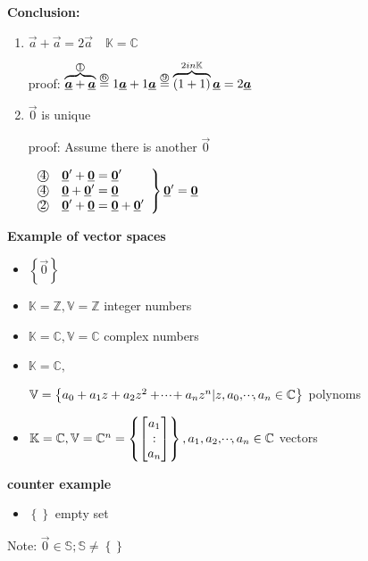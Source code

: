 \textbf{Conclusion:}
\begin{enumerate}
\item $\vec{a}+\vec{a}=2\vec{a} \quad \mathbb{K}=\mathbb{C}$

proof:	$\overbrace{\underline{\boldsymbol {a}}+\underline{\boldsymbol {a}}}^{\textrm{\textcircled{1}}}  \overset{\textrm{\textcircled{6}}}{=} 1\underline{\boldsymbol {a}}+1\underline{\boldsymbol {a}} \overset{\textrm{\textcircled{9}}}{=} \overbrace{(1+1)}^{2 in\mathbb{K}}\underline{\boldsymbol {a}}=2\underline{\boldsymbol {a}}$
\item $\vec{0}$ is unique 


proof: Assume there is another $\vec{0}$

$\left. \begin{array}{l}
\textrm{\textcircled{4}}\quad \underline{\boldsymbol {0}}'+\underline{\boldsymbol {0}}= \underline{\boldsymbol {0}}'\\
\textrm{\textcircled{4}}\quad \underline{\boldsymbol {0}}+\underline{\boldsymbol {0}}'= \underline{\boldsymbol {0}}\\
\textrm{\textcircled{2}}\quad \underline{\boldsymbol {0}}'+\underline{\boldsymbol {0}}=\underline{\boldsymbol {0}}+\underline{\boldsymbol {0}}'
\end{array} \right\rbrace
\underline{\boldsymbol {0}}'=\underline{\boldsymbol {0}}$
\end{enumerate}

\textbf{Example of vector spaces}

\begin{itemize}
\item $\left\lbrace\vec{0}\right\rbrace$ 
\item $\mathbb{K}=\mathbb{Z}, \mathbb{V}=\mathbb{Z}$ \quad integer numbers
\item $\mathbb{K}=\mathbb{C}, \mathbb{V}=\mathbb{C}$ \quad complex numbers
\item $\mathbb{K}=\mathbb{C},$

$\mathbb{V}=\left\lbrace a_0+a_1z+a_2z^2+ \shdots +a_nz^n |z,a_0,\shdots,a_n \in \mathbb{C} \right\rbrace$ \quad polynoms
\item $\mathbb{K}=\mathbb{C}, \mathbb{V}=\mathbb{C}^n=\left\lbrace \begin{bmatrix}
a_1 \\ : \\ a_n
\end{bmatrix} \right\rbrace, a_1,a_2,\!\cdot \!\cdot\!\cdot\!,a_n \in \mathbb{C}$ \quad vectors 
\end{itemize}

\textbf{counter example}

\begin{itemize}
\item $\left\lbrace \right\rbrace$ \quad empty set
\end{itemize}

Note: $\vec{0}\in\mathbb{S}; \mathbb{S}\neq\left\lbrace\right\rbrace$

